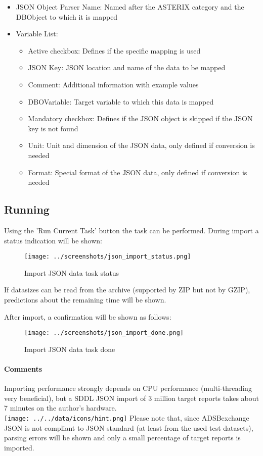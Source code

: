 \begin{itemize}  
\item JSON Object Parser Name: Named after the ASTERIX category and the DBObject to which it is mapped
\item Variable List:
\begin{itemize}  
\item Active checkbox: Defines if the specific mapping is used
\item JSON Key: JSON location and name of the data to be mapped
\item Comment: Additional information with example values
\item DBOVariable: Target variable to which this data is mapped
\item Mandatory checkbox: Defines if the JSON object is skipped if the JSON key is not found
\item Unit: Unit and dimension of the JSON data, only defined if conversion is needed
\item Format: Special format of the JSON data, only defined if conversion is needed
\end{itemize}
\end{itemize}

\subsection{Running}

Using the 'Run Current Task' button the task can be performed. During import a status indication will be shown:

\begin{figure}[H]
  \center
    \texttt{[image: ../screenshots/json\_import\_status.png]}
  \caption{Import JSON data task status}
\end{figure}

If datasizes can be read from the archive (supported by ZIP but not by GZIP), predictions about the remaining time will be shown.

After import, a confirmation will be shown as follows:

\begin{figure}[H]
  \center
    \texttt{[image: ../screenshots/json\_import\_done.png]}
  \caption{Import JSON data task done}
\end{figure}

\paragraph{Comments}

Importing performance strongly depends on CPU performance (multi-threading very beneficial), but a SDDL JSON import of 3 million target reports takes about 7 minutes on the author's hardware. \\

\texttt{[image: ../../data/icons/hint.png]} Please note that, since ADSBexchange JSON is not compliant to JSON standard (at least from the used test datasets), parsing errors will be shown and only a small percentage of target reports is imported.
